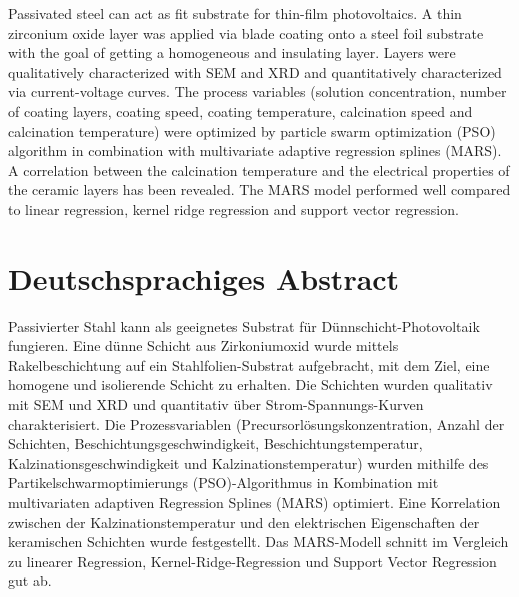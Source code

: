 Passivated steel can act as fit substrate for thin-film photovoltaics.
A thin zirconium oxide layer was applied via blade coating onto a steel foil substrate with the goal of getting a homogeneous and insulating layer.
Layers were qualitatively characterized with SEM and XRD and quantitatively characterized via current-voltage curves.
The process variables (solution concentration, number of coating layers, coating speed, coating temperature, calcination speed and calcination temperature) were optimized by particle swarm optimization (PSO) algorithm in combination with multivariate adaptive regression splines (MARS).
A correlation between the calcination temperature and the electrical properties of the ceramic layers has been revealed. 
The MARS model performed well compared to 
linear regression, kernel ridge regression and support vector regression.

\clearpage

\chapter*{Deutschsprachiges Abstract}
\noindent Passivierter Stahl kann als geeignetes Substrat für Dünnschicht-Photovoltaik fungieren. 
Eine dünne Schicht aus Zirkoniumoxid wurde mittels Rakelbeschichtung auf ein Stahlfolien-Substrat aufgebracht, mit dem Ziel, eine homogene und isolierende Schicht zu erhalten. 
Die Schichten wurden qualitativ mit SEM und XRD und quantitativ über Strom-Spannungs-Kurven charakterisiert. 
Die Prozessvariablen (Precursorlösungskonzentration, Anzahl der Schichten, Beschichtungsgeschwindigkeit, Beschichtungstemperatur, Kalzinationsgeschwindigkeit und Kalzinationstemperatur) wurden mithilfe des Partikelschwarmoptimierungs (PSO)-Algorithmus in Kombination mit multivariaten adaptiven Regression Splines (MARS) optimiert. Eine Korrelation zwischen der Kalzinationstemperatur und den elektrischen Eigenschaften der keramischen Schichten wurde festgestellt. Das MARS-Modell schnitt im Vergleich zu linearer Regression, Kernel-Ridge-Regression und Support Vector Regression gut ab.
